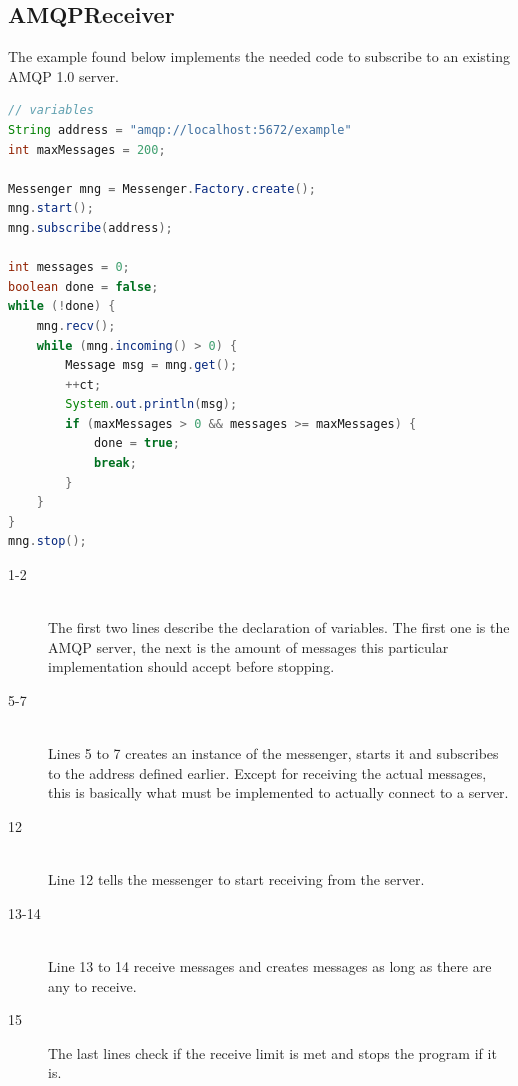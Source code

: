 \subsection{AMQPReceiver}
The example found below implements the needed code to subscribe to an existing AMQP 1.0 server.


\begin{lstlisting}[language=Java, captionpos=b, caption=Example use of Messenger to subscribe, frame=bt, showstringspaces=false,label={lst:AMQPReceiver}]
// variables
String address = "amqp://localhost:5672/example"
int maxMessages = 200;

Messenger mng = Messenger.Factory.create();
mng.start();
mng.subscribe(address);

int messages = 0;
boolean done = false;
while (!done) {
    mng.recv();
    while (mng.incoming() > 0) {
        Message msg = mng.get();
        ++ct;
        System.out.println(msg);
        if (maxMessages > 0 && messages >= maxMessages) {
            done = true;
            break;
        }
    }
}
mng.stop();
\end{lstlisting}

\begin{description}
\item[1-2] \hfill \\ The first two lines describe the declaration of variables. The first one is the AMQP server, the next is the amount of messages this particular implementation should accept before stopping.

\item[5-7] \hfill \\ Lines 5 to 7 creates an instance of the messenger, starts it and subscribes to the address defined earlier. Except for receiving the actual messages, this is basically what must be implemented to actually connect to a server.

\item[12] \hfill \\ Line 12 tells the messenger to start receiving from the server. 
\item[13-14] \hfill \\ Line 13 to 14 receive messages and creates messages as long as there are any to receive.

\item[15] \hfill The last lines check if the receive limit is met and stops the program if it is.
\end{description}

\clearpage